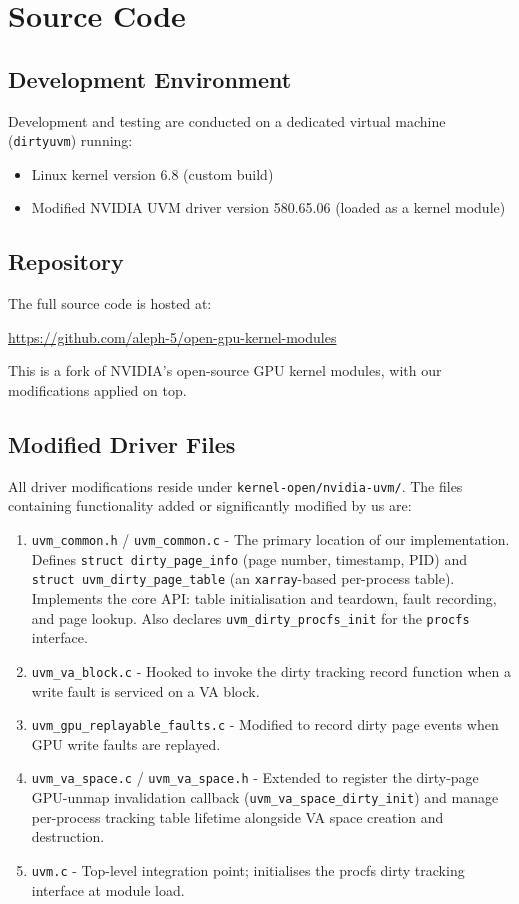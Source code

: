 \section*{Source Code}

\subsection*{Development Environment}
Development and testing are conducted on a dedicated virtual machine (\texttt{dirtyuvm}) running:
\begin{itemize}
    \item Linux kernel version 6.8 (custom build)
    \item Modified NVIDIA UVM driver version 580.65.06 (loaded as a kernel module)
\end{itemize}

\subsection*{Repository}
The full source code is hosted at:
\begin{center}
    \url{https://github.com/aleph-5/open-gpu-kernel-modules}
\end{center}
This is a fork of NVIDIA's open-source GPU kernel modules, with our modifications applied on top.

\subsection*{Modified Driver Files}
All driver modifications reside under \texttt{kernel-open/nvidia-uvm/}. The files containing functionality added or significantly modified by us are:

\begin{enumerate}
    \item \texttt{uvm\_common.h} / \texttt{uvm\_common.c} - The primary location of our implementation. Defines \texttt{struct dirty\_page\_info} (page number, timestamp, PID) and \texttt{struct uvm\_dirty\_page\_table} (an \texttt{xarray}-based per-process table). Implements the core API: table initialisation and teardown, fault recording, and page lookup. Also declares \texttt{uvm\_dirty\_procfs\_init} for the \texttt{procfs} interface.
    \item \texttt{uvm\_va\_block.c} - Hooked to invoke the dirty tracking record function when a write fault is serviced on a VA block.
    \item \texttt{uvm\_gpu\_replayable\_faults.c} - Modified to record dirty page events when GPU write faults are replayed.
    \item \texttt{uvm\_va\_space.c} / \texttt{uvm\_va\_space.h} - Extended to register the dirty-page GPU-unmap invalidation callback (\texttt{uvm\_va\_space\_dirty\_init}) and manage per-process tracking table lifetime alongside VA space creation and destruction.
    \item \texttt{uvm.c} - Top-level integration point; initialises the procfs dirty tracking interface at module load.
\end{enumerate}

